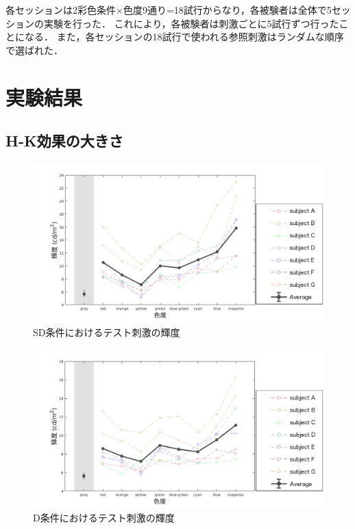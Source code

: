             各セッションは2彩色条件$\times$色度9通り=18試行からなり，各被験者は全体で5セッションの実験を行った．
            これにより，各被験者は刺激ごとに5試行ずつ行ったことになる．
            また，各セッションの18試行で使われる参照刺激はランダムな順序で選ばれた．

    \section{実験結果}

        \subsection{H-K効果の大きさ}

            \begin{figure}[h]
                \centering
                \includegraphics[width=14.0cm]{./img/ex2_res_SD_p.png}
                \caption{SD条件におけるテスト刺激の輝度}
                \label{ex2_SD}
            \end{figure}

            \begin{figure}[h]
                \centering
                \includegraphics[width=14.0cm]{./img/ex2_res_D_p.png}
                \caption{D条件におけるテスト刺激の輝度}
                \label{ex2_D}
            \end{figure}

